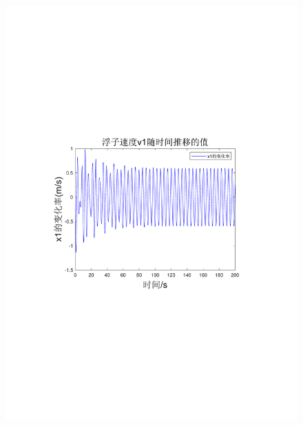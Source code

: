 \documentclass[12pt,utf8]{article}
\begin{document}
\begin{figure}[htbp]
\begin{minipage}{0.45\linewidth}
		\includegraphics[width=0.9\linewidth]{figures/T1-2浮子速度v1.pdf}
		\label{chutian2}%
	\end{minipage}
	\begin{minipage}{0.45\linewidth}

\end{minipage}
\end{figure}
\end{document}
